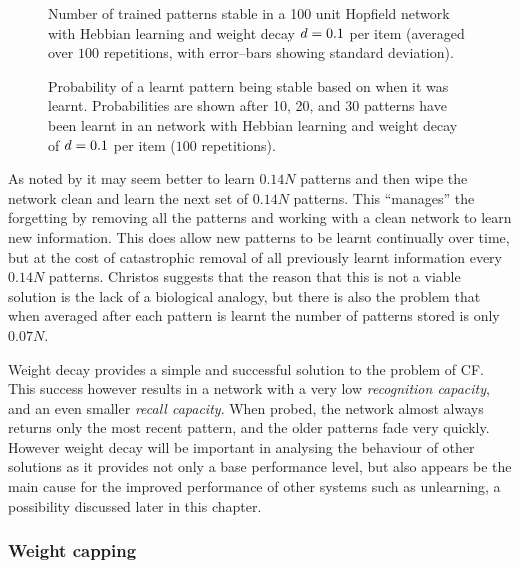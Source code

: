 \begin{figure}[tbp]
\small
\center
	\caption{Number of trained patterns stable in a 100 unit Hopfield network  with Hebbian learning and weight decay $d = 0.1$ per item (averaged over $100$ repetitions, with error--bars showing standard deviation).}
	\label{fig:WeightDecay100num}
\end{figure}

\begin{figure}[tbp]
\small
\center
	\caption{Probability of a learnt pattern being stable based on when it was learnt.  Probabilities are shown after 10, 20, and 30 patterns have been learnt in an  network with Hebbian learning and weight decay of $d = 0.1$ per item ($100$ repetitions).}
	\label{fig:WeightDecay100pos}
\end{figure}

As noted by \citet{Christos1996} it may seem better to learn $0.14N$ patterns and then wipe the network clean and learn the next set of $0.14N$ patterns.  This ``manages'' the forgetting by removing all the patterns and working with a clean network to learn new information.  This does allow new patterns to be learnt continually over time, but at the cost of catastrophic removal of all previously learnt information every $0.14N$ patterns.  Christos suggests that the reason that this is not a viable solution is the lack of a biological analogy, but there is also the problem that when averaged after each pattern is learnt the number of patterns stored is only $0.07N$.

Weight decay provides a simple and successful solution to the problem of CF.  This success however results in a network with a very low \emph{recognition capacity}, and an even smaller \emph{recall capacity}.  When probed, the network almost always returns only the most recent pattern, and the older patterns fade very quickly.  However weight decay will be important in analysing the behaviour of other solutions as it provides not only a base performance level, but also appears be the main cause for the improved performance of other systems such as unlearning, a possibility discussed later in this chapter.

\subsubsection{Weight capping}

